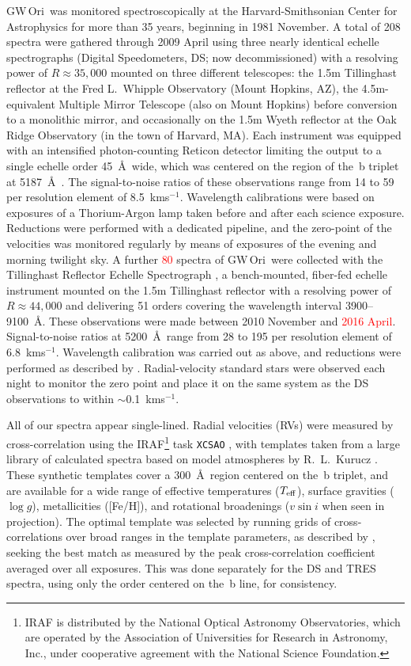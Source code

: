\documentclass[twocolumn]{aastex61}
\newcommand\kms{\ifmmode{\rm km\thinspace s^{-1}}\else km\thinspace s$^{-1}$\fi}
\newcommand{\todo}[1]{ \textcolor{red}{#1}}
\newcommand{\gw}{GW\,Ori}
\begin{document}
\gw\ was monitored spectroscopically at the Harvard-Smithsonian Center for Astrophysics for more than 35 years, beginning in 1981 November. A total of 208 spectra were gathered through 2009 April using three nearly identical echelle spectrographs (Digital Speedometers, DS; now decommissioned) with a resolving power of $R \approx 35,000$ mounted on three different telescopes: the 1.5m Tillinghast reflector at the Fred L.\ Whipple Observatory (Mount Hopkins, AZ), the 4.5m-equivalent Multiple Mirror Telescope (also on Mount Hopkins) before conversion to a monolithic mirror, and occasionally on the 1.5m Wyeth reflector at the Oak Ridge Observatory (in the town of Harvard, MA).  Each instrument was equipped with an intensified photon-counting Reticon detector limiting the output to a single echelle order 45~\AA\ wide, which was centered on the region of the \,b triplet at 5187~\AA\ \citep[see][]{latham92}. The signal-to-noise ratios of these observations range from 14 to 59 per resolution element of 8.5~\kms. Wavelength calibrations were based on exposures of a Thorium-Argon lamp taken before and after each science exposure. Reductions were performed with a dedicated pipeline, and the zero-point of the velocities was monitored regularly by means of exposures of the evening and morning twilight sky. A further \todo{80} spectra of \gw\ were collected with the Tillinghast Reflector Echelle Spectrograph \citep[TRES;][]{furesz08}, a bench-mounted, fiber-fed echelle instrument mounted on the 1.5m Tillinghast reflector with a resolving power of $R \approx 44,000$ and delivering 51 orders covering the wavelength interval 3900--9100~\AA. These observations were made between 2010 November and \todo{2016 April}.  Signal-to-noise ratios at 5200~\AA\ range from 28 to 195 per resolution element of 6.8~\kms. Wavelength calibration was carried out as above, and reductions were performed as described by \cite{buchhave10}. Radial-velocity standard stars were observed each night to monitor the zero point and place it on the same system as the DS observations to within $\sim$0.1~\kms.

All of our spectra appear single-lined.  Radial velocities (RVs) were measured by cross-correlation using the IRAF\footnote{IRAF is distributed by the National Optical Astronomy Observatories, which are operated by the Association of Universities for Research in Astronomy, Inc., under cooperative agreement with the National Science Foundation.} task {\tt XCSAO} \citep{kurtz98}, with templates taken from a large library of calculated spectra based on model atmospheres by R.\ L.\ Kurucz \citep[see][]{nordstroem94,latham02}.
These synthetic templates cover a 300~\AA\ region centered on the \,b triplet, and are available for a wide range of effective temperatures ($T_{\rm eff}$), surface gravities ($\log g$), metallicities ([Fe/H]), and rotational broadenings ($v \sin i$ when seen in projection). The optimal template was selected by running grids of cross-correlations over broad ranges in the template parameters, as described by \cite{torres02}, seeking the best match as measured by the peak cross-correlation coefficient averaged over all exposures. This was done separately for the DS and TRES spectra, using only the order centered on the \,b line, for consistency.
\end{document}
